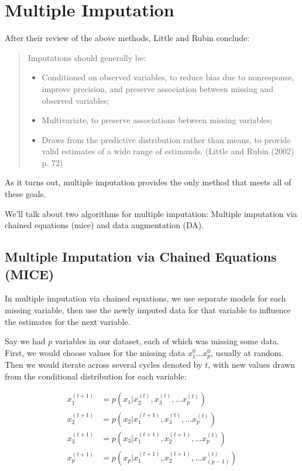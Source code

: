 \documentclass[12 pt]{article}
\begin{document}
\section{Multiple Imputation}
\label{sec:multiple-imputation}
After their review of the above methods, Little and Rubin conclude: 

\begin{quote}
  Imputations should generally be:
  \begin{itemize}
  \item Conditioned on observed variables, to reduce bias due to
    nonresponse, improve precision, and preserve association between
    missing and observed variables;


  \item Multivariate, to preserve associations between missing
    variables;


  \item Draws from the predictive distribution rather than means, to
    provide valid estimates of a wide range of estimands. (Little and
    Rubin (2002) p. 72) 
  \end{itemize}
\end{quote}

As it turns out, multiple imputation provides the only method that
meets all of these goals. 

We'll talk about two algorithms for multiple imputation: Multiple
imputation via chained equations (mice) and data augmentation (DA). 

\subsection{Multiple Imputation via Chained Equations (MICE)}
\label{sec:mult-imput-via}

In multiple imputation via chained equations, we use separate models
for each missing variable, then use the newly imputed data for that
variable to influence the estimates for the next variable. 


Say we had $p$ variables in our dataset, each of which was missing some data. First,
we would choose values for the missing data $x_1^0 \ldots x_p^0$,
usually at random. Then we would iterate across several cycles denoted
by $t$, with new values drawn from the conditional distribution for
each variable:

\begin{align*}
  x_1^{(t+1)}&=p(x_1|x_2^{(t)},x_3^{(t)},\ldots x_p^{(t)})\\
  x_2^{(t+1)}&=p(x_2|x_1^{(t+1)},x_3^{(t)},\ldots x_p^{(t)})\\
  x_3^{(t+1)}&=p(x_3|x_1^{(t+1)},x_2^{(t+1)},\ldots x_p^{(t)})\\
  x_p^{(t+1)}&=p(x_p|x_1^{(t+1)},x_2^{(t+1)},\ldots x_{(p-1)}^{(t)})
\end{align*}
\end{document}
